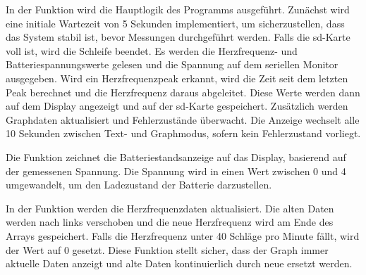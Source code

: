 \begin{code}[h]
\end{code}


In der Funktion  wird die Hauptlogik des Programms ausgeführt. Zunächst wird eine initiale Wartezeit von 5 Sekunden implementiert, um sicherzustellen, dass das System stabil ist, bevor Messungen durchgeführt werden. Falls die \ac{sd}-Karte voll ist, wird die Schleife beendet. Es werden die Herzfrequenz- und Batteriespannungswerte gelesen und die Spannung auf dem seriellen Monitor ausgegeben. Wird ein Herzfrequenzpeak erkannt, wird die Zeit seit dem letzten Peak berechnet und die Herzfrequenz daraus abgeleitet. Diese Werte werden dann auf dem Display angezeigt und auf der \ac{sd}-Karte gespeichert. Zusätzlich werden Graphdaten aktualisiert und Fehlerzustände überwacht. Die Anzeige wechselt alle 10 Sekunden zwischen Text- und Graphmodus, sofern kein Fehlerzustand vorliegt.

\begin{code}[h]
\end{code}

Die Funktion  zeichnet die Batteriestandsanzeige auf das Display, basierend auf der gemessenen Spannung. Die Spannung wird in einen Wert zwischen 0 und 4 umgewandelt, um den Ladezustand der Batterie darzustellen.


\begin{code}[h]
\end{code}


In der Funktion  werden die Herzfrequenzdaten aktualisiert. Die alten Daten werden nach links verschoben und die neue Herzfrequenz wird am Ende des Arrays gespeichert. Falls die Herzfrequenz unter 40 Schläge pro Minute fällt, wird der Wert auf 0 gesetzt. Diese Funktion stellt sicher, dass der Graph immer aktuelle Daten anzeigt und alte Daten kontinuierlich durch neue ersetzt werden.

\begin{code}[h]
\end{code}

